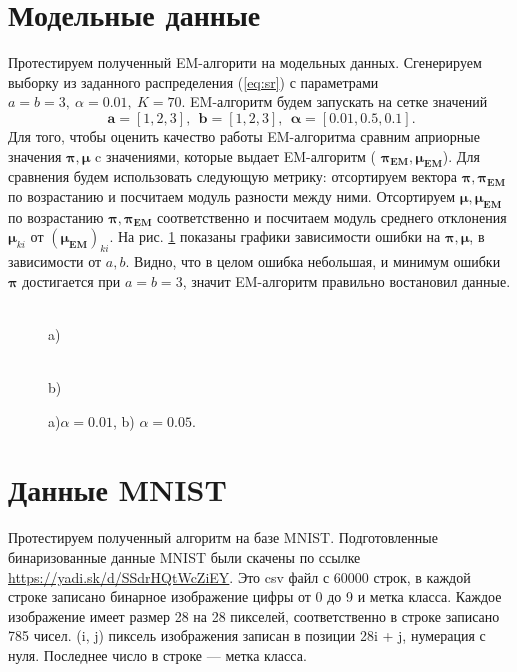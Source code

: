 \documentclass[twoside]{article}
\begin{document}
	\section{Модельные данные}
	Протестируем полученный EM-алгорити на модельных данных. Сгенерируем выборку из заданного распределения (\ref{eq:sr}) с параметрами $a = b = 3,\: \alpha = 0.01,\: K = 70$. EM-алгоритм будем запускать на сетке значений 
	\[\ \boldsymbol{a} = [1, 2, 3], \: \: \boldsymbol{b} = [1, 2, 3], \: \: \boldsymbol\alpha = [0.01, 0.5, 0.1].\]
	Для того, чтобы оценить качество работы EM-алгоритма сравним априорные значения  $\boldsymbol{\pi}, \boldsymbol{\mu}$ c значениями, которые выдает EM-алгоритм ( $\boldsymbol{\pi_{EM}}, \boldsymbol{\mu_{EM}}$). Для сравнения будем использовать следующую метрику: 
	отсортируем вектора $\boldsymbol{\pi}, \boldsymbol{\pi_{EM}}$ по возрастанию и посчитаем модуль разности между ними. Отсортируем $\boldsymbol{\mu},  \boldsymbol{\mu_{EM}}$ по возрастанию $\boldsymbol{\pi}, \boldsymbol{\pi_{EM}}$ соответственно и посчитаем модуль среднего отклонения $\boldsymbol\mu_{ki}$ от $(\boldsymbol{\mu_{EM}})_{ki}$. На рис. \ref{fig:1} показаны графики зависимости ошибки на  $\boldsymbol{\pi}, \boldsymbol{\mu}$, в зависимости от $a,b$. Видно, что в целом ошибка небольшая, и минимум ошибки  $\boldsymbol{\pi}$ достигается при $a = b = 3$, значит EM-алгоритм правильно востановил данные.%
	
	\begin{figure}[h!]
		\begin{minipage}[h]{0.49\linewidth}
			 \\a) 
		\end{minipage}
		\hfill
		\begin{minipage}[h]{0.49\linewidth}
			 \\b)
		\end{minipage}
		\caption{a)$ \alpha = 0.01$, b) $\alpha = 0.05$.}
		\label{fig:1}
	\end{figure}
	
	\section{Данные MNIST}
	Протестируем полученный алгоритм на базе MNIST.
	Подготовленные бинаризованные данные MNIST были скачены	 по ссылке \href{https://yadi.sk/d/SSdrHQtWcZiEY}{https://yadi.sk/d/SSdrHQtWcZiEY}.
	Это csv файл с 60000 строк, в каждой строке записано бинарное изображение цифры от 0 до 9 и метка класса.
	Каждое изображение имеет размер 28 на 28 пикселей, соответственно в строке записано 785 чисел. (i, j) пиксель
	изображения записан в позиции 28i + j, нумерация с нуля. Последнее число в строке — метка класса.
\end{document}
